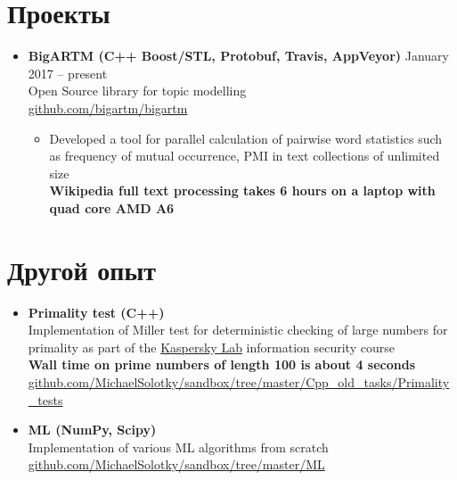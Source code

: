 \documentclass[letterpaper,11pt]{article}
\newcommand{\resumeSubHeadingListStart}{\begin{itemize}[leftmargin=*]}
\newcommand{\resumeSubHeadingListEnd}{\end{itemize}}
\begin{document}
\section{Проекты}
\resumeSubHeadingListStart
    \item{
      \textbf{{BigARTM}{ (C++ Boost/STL, Protobuf, Travis, AppVeyor)}}
      \hfill
      January 2017 -- present
    } \\
    Open Source library for topic modelling \\
    \faGithub \enspace \href{https://github.com/bigartm/bigartm}{\color{blue} github.com/bigartm/bigartm}
    \begin{itemize}
      \item Developed a tool for parallel calculation of pairwise word statistics such as frequency of mutual occurrence, PMI in text collections of unlimited size \\
      \textbf{Wikipedia full text processing takes 6 hours on a laptop with quad core AMD A6}
    \end{itemize}

  \resumeSubHeadingListEnd


\section{Другой опыт}
  \resumeSubHeadingListStart
      \item{
        \textbf{{Primality test}{ (C++) }} \\
        Implementation of Miller test for deterministic checking of large numbers for primality as part of the \href{https://www.kaspersky.com/}{\color{blue} Kaspersky Lab} information security course \\
        \textbf{Wall time on prime numbers of length 100 is about 4 seconds} \\
        \faGithub \enspace \href{https://github.com/MichaelSolotky/sandbox/tree/master/Cpp_old_tasks/Primality_tests}{\color{blue} github.com/MichaelSolotky/sandbox/tree/master/Cpp\_old\_tasks/Primality\_tests}
      }

      \item{
        \textbf{ML (NumPy, Scipy)} \\
        Implementation of various ML algorithms from scratch \\
        \faGithub \enspace \href{https://github.com/MichaelSolotky/sandbox/tree/master/ML}{\color{blue} github.com/MichaelSolotky/sandbox/tree/master/ML}
      }
      \resumeSubHeadingListEnd
\end{document}
